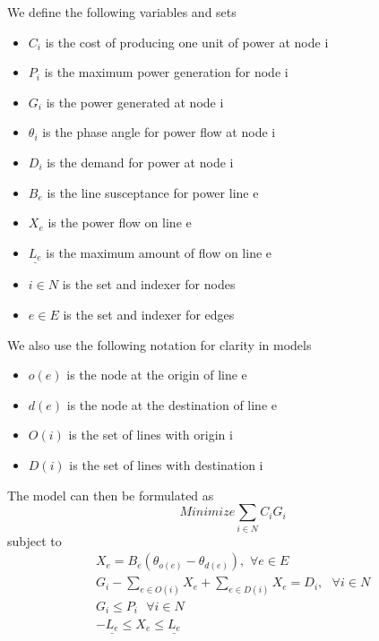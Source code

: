\documentclass{article}
\begin{document}
	We define the following variables and sets
	\begin{itemize}
		\item $C_i$ is the cost of producing one unit of power at node i
		\item $P_i$ is the maximum power generation for node i
		\item $G_i$ is the power generated at node i
		\item $\theta_i$ is the phase angle for power flow at node i 
		\item $D_i$ is the demand for power at node i
		\item $B_e$ is the line susceptance for power line e
		\item $X_e$ is the power flow on line e
		\item $\underline{L_e}$ is the maximum amount of flow on line e
		\item $i \in N$ is the set and indexer for nodes
		\item $e \in E$ is the set and indexer for edges
	\end{itemize}
	We also use the following notation for clarity in models
	\begin{itemize}
		\item $o(e)$ is the node at the origin of line e
		\item $d(e)$ is the node at the destination of line e
		\item $O(i)$ is the set of lines with origin i
		\item $D(i)$ is the set of lines with destination i
	\end{itemize}
	The model can then be formulated as 
	\begin{equation}
Minimize \sum_{i\in N} C_i G_i
	\end{equation} 
	subject to
	\begin{eqnarray}
	X_e = B_e (\theta_{o(e)} - \theta_{d(e)}), \hspace{4pt} \forall e \in E\\
	G_i - \sum_{e \in O(i)} X_e + \sum_{e \in D(i)} X_e = D_i, \hspace{4pt} \hspace{4pt} \forall i \in N\\
	  G_i \leq P_{i} \hspace{4pt} \hspace{4pt} \forall i \in N	\\ 
	  -\underline{L_e} \leq X_e \leq \underline{L_e}
\end{eqnarray}
\end{document}
